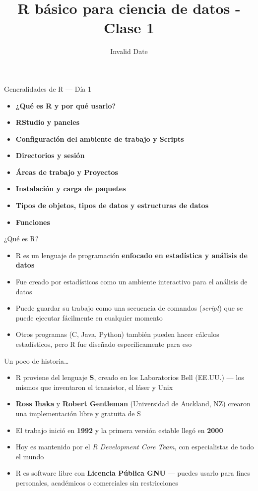 \documentclass[
  9pt,
  ignorenonframetext,
]{beamer}
\title{R básico para ciencia de datos - Clase 1}
\author{}
\date{Invalid Date}
\providecommand{\tightlist}{%
  \setlength{\itemsep}{0pt}\setlength{\parskip}{0pt}}\usepackage{longtable,booktabs,array}
\begin{document}
\frame{\titlepage}


\begin{frame}{Generalidades de R --- Día 1}
\label{generalidades-de-r-duxeda-1}
\begin{itemize}
\tightlist
\item
  \textbf{¿Qué es R y por qué usarlo?}
\item
  \textbf{RStudio y paneles}
\item
  \textbf{Configuración del ambiente de trabajo y Scripts}
\item
  \textbf{Directorios y sesión}
\item
  \textbf{Áreas de trabajo y Proyectos}
\item
  \textbf{Instalación y carga de paquetes}
\item
  \textbf{Tipos de objetos, tipos de datos y estructuras de datos}
\item
  \textbf{Funciones}
\end{itemize}
\end{frame}

\begin{frame}{¿Qué es R?}
\label{quuxe9-es-r}
\begin{itemize}
\tightlist
\item
  R es un lenguaje de programación \textbf{enfocado en estadística y
  análisis de datos}
\item
  Fue creado por estadísticos como un ambiente interactivo para el
  análisis de datos
\item
  Puede guardar su trabajo como una secuencia de comandos
  (\emph{script}) que se puede ejecutar fácilmente en cualquier momento
\item
  Otros programas (C, Java, Python) también pueden hacer cálculos
  estadísticos, pero R fue diseñado específicamente para eso
\end{itemize}
\end{frame}

\begin{frame}{Un poco de historia\ldots{}}
\label{un-poco-de-historia}
\begin{itemize}
\tightlist
\item
  R proviene del lenguaje \textbf{S}, creado en los Laboratorios Bell
  (EE.UU.) --- los mismos que inventaron el transistor, el láser y Unix
\item
  \textbf{Ross Ihaka} y \textbf{Robert Gentleman} (Universidad de
  Auckland, NZ) crearon una implementación libre y gratuita de S
\item
  El trabajo inició en \textbf{1992} y la primera versión estable llegó
  en \textbf{2000}
\item
  Hoy es mantenido por el \emph{R Development Core Team}, con
  especialistas de todo el mundo
\item
  R es software libre con \textbf{Licencia Pública GNU} --- puedes
  usarlo para fines personales, académicos o comerciales sin
  restricciones
\end{itemize}
\end{frame}
\end{document}

